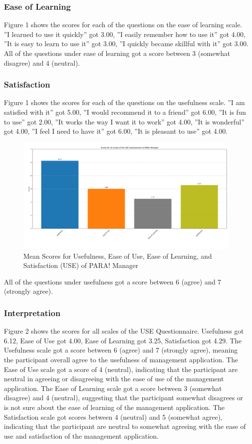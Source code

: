 \documentclass[journal]{./IEEE/IEEEtran}
\begin{document}
\subsubsection{Ease of Learning}
Figure 1 shows the scores for each of the questions on the ease of learning scale. ”I learned to use it quickly” got 3.00, ”I easily remember how to use it” got 4.00, ”It is easy to learn to use it” got 3.00, ”I quickly became skillful with it” got 3.00.
All of the questions under ease of learning got a score between 3 (somewhat disagree) and 4 (neutral).
\subsubsection{Satisfaction}
Figure 1 shows the scores for each of the questions on the usefulness scale. ”I am satisfied with it” got 5.00, ”I would recommend it to a friend” got 6.00, ”It is fun to use” got 2.00, ”It works the way I want it to work” got 4.00, ”It is wonderful” got 4.00, ”I feel I need to have it” got 6.00, ”It is pleasant to use” got 4.00.
\begin{figure}[h]
    \centering
        \includegraphics[scale=0.18]{./figures/manager means total.png}
    \caption{Mean Scores for Usefulness, Ease of Use, Ease of Learning, and Satisfaction (USE) of PARA! Manager}
\end{figure}
All of the questions under usefulness got a score between 6 (agree) and 7 (strongly agree).
\subsubsection{Interpretation}
Figure 2 shows the scores for all scales of the USE Questionnaire.
Usefulness got 6.12, Ease of Use got 4.00, Ease of Learning got 3.25, Satisfaction got 4.29.
The Usefulness scale got a score between 6 (agree) and 7 (strongly agree), meaning the participant overall agree to the usefulness of management application.
The Ease of Use scale got a score of 4 (neutral), indicating that the participant are neutral in agreeing or disagreeing with the ease of use of the management application.
The Ease of Learning scale got a score between 3 (somewhat disagree) and 4 (neutral), suggesting that the participant somewhat disagrees or is not sure about the ease of learning  of the management application.
The Satisfaction scale got scores between 4 (neutral) and 5 (somewhat agree), indicating that the participant are neutral to somewhat agreeing with the ease of use and satisfaction of the management application.
\end{document}

